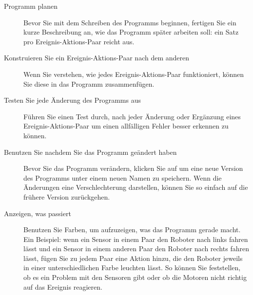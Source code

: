\begin{description}

\item[Programm planen] Bevor Sie mit dem Schreiben des Programms beginnen, fertigen Sie ein kurze Beschreibung an, wie das Programm später arbeiten soll: ein Satz pro Ereignis-Aktions-Paar reicht aus. 

\item[Konstruieren Sie ein Ereignis-Aktions-Paar nach dem anderen] Wenn Sie verstehen, wie jedes Ereignis-Aktions-Paar funktioniert, können Sie diese in das Programm zusammenfügen. 

\item[Testen Sie jede Änderung des Programms aus] Führen Sie einen Test durch, nach jeder Änderung oder Ergänzung eines Ereignis-Aktions-Paar um einen allfälligen Fehler besser erkennen zu können. 

\item[Benutzen Sie  nachdem Sie das Programm geändert haben] Bevor Sie das Programm verändern, klicken Sie auf  um eine neue Version des Programms unter einem neuen Namen zu speichern. Wenn die Änderungen eine Verschlechterung darstellen, können Sie so einfach auf die frühere Version zurückgehen. 

\item[Anzeigen, was passiert] Benutzen Sie Farben, um aufzuzeigen, was das Programm gerade macht. Ein Beispiel: wenn ein Sensor in einem Paar den Roboter nach links fahren lässt und ein Sensor in einem anderen Paar den Roboter nach rechts fahren lässt, fügen Sie zu jedem Paar eine Aktion hinzu, die den Roboter jeweils in einer unterschiedlichen Farbe leuchten lässt. So können Sie feststellen, ob es ein Problem mit den Sensoren gibt oder ob die Motoren nicht richtig auf das Ereignis reagieren. 


\end{description}



